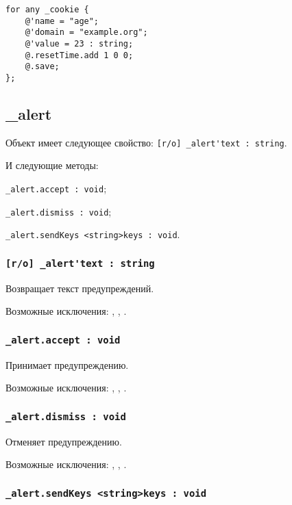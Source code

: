 \begin{lstlisting}[caption=Создания новых cookie, label=newcookies]
for any _cookie {
	@'name = "age";
	@'domain = "example.org";
	@'value = 23 : string;
	@.resetTime.add 1 0 0;
	@.save;
};
\end{lstlisting}


\subsection{{\color{orange} \_alert}}

Объект \alert{} имеет следующее свойство: \lstinline|[r/o] _alert'text : string|.

И следующие методы:
\begin{icItems}
	\item \lstinline|_alert.accept : void|;
	\item \lstinline|_alert.dismiss : void|;
	\item \lstinline|_alert.sendKeys <string>keys : void|.
\end{icItems}

\subsubsection{\lstinline|[r/o] _alert'text : string|}

Возвращает текст предупреждений.

Возможные исключения: , , .

\subsubsection{\lstinline|_alert.accept : void|}

Принимает предупреждению.

Возможные исключения: , , .

\subsubsection{\lstinline|_alert.dismiss : void|}

Отменяет предупреждению.

Возможные исключения: , , .

\subsubsection{\lstinline|_alert.sendKeys <string>keys : void|}

